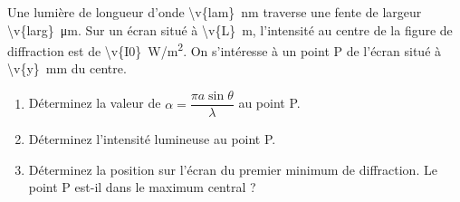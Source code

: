Une lumière de longueur d'onde \qty{\v{lam}}{nm} traverse une fente de largeur \qty{\v{larg}}{\micro\metre}. Sur un écran situé à \qty{\v{L}}{m}, l'intensité au centre de la figure de diffraction est de \qty{\v{I0}}{W/m^2}. On s'intéresse à un point P de l'écran situé à \qty{\v{y}}{mm} du centre.

\begin{enumerate}[label=\alph*)]
    \item Déterminez la valeur de $\alpha = \dfrac{\pi a \sin\theta}{\lambda}$ au point P.
    \item Déterminez l'intensité lumineuse au point P.
    \item Déterminez la position sur l'écran du premier minimum de diffraction. Le point P est-il dans le maximum central ?
\end{enumerate}
